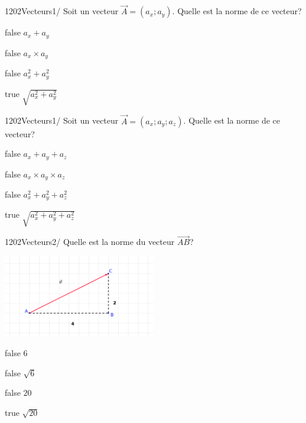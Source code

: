         	\begin{question}{1202}{Vecteurs}{1}{/}
				Soit un vecteur $\vec{A}=(a_x;a_y)$. Quelle est la norme de ce vecteur?
            \end{question}
            \begin{reponses}
            	\item[false] $a_x+a_y$
            	\item[false] $a_x\times a_y$
                \item[false] $a_{x}^2+a_{y}^2$
                \item[true] $\sqrt{a_{x}^2+a_{y}^2}$
            \end{reponses}
        	\begin{question}{1202}{Vecteurs}{1}{/}
				Soit un vecteur $\vec{A}=(a_x;a_y;a_z)$. Quelle est la norme de ce vecteur?
            \end{question}
            \begin{reponses}
            	\item[false] $a_x+a_y+a_z$
            	\item[false] $a_x\times a_y\times a_z$
                \item[false] $a_{x}^2+a_{y}^2+a_{z}^2$
                \item[true] $\sqrt{a_{x}^2+a_{y}^2+a_{z}^2}$
            \end{reponses}
            \begin{question}{1202}{Vecteurs}{2}{/}
                Quelle est la norme du vecteur $\vec{AB}$?
                \begin{center}
                	\includegraphics[width=0.5\textwidth]{Philippe/Figures_Philippe/vecteurs_4_2.png}
                \end{center}
            \end{question}
            \begin{reponses}
                \item[false] 6
                \item[false] $\sqrt{6}$
                \item[false] $20$
                \item[true] $\sqrt{20}$ 
            \end{reponses}
